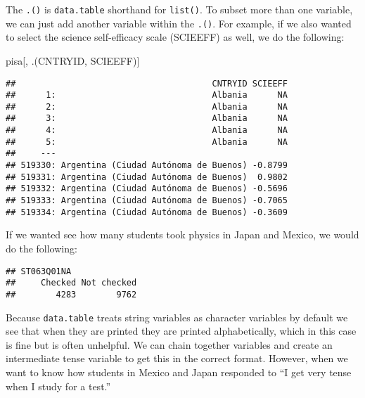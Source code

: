 \documentclass[]{book}
\newenvironment{Shaded}{\begin{snugshade}}{\end{snugshade}}
\newcommand{\KeywordTok}[1]{\textcolor[rgb]{0.13,0.29,0.53}{\textbf{#1}}}
\newcommand{\NormalTok}[1]{#1}
\newcommand{\OperatorTok}[1]{\textcolor[rgb]{0.81,0.36,0.00}{\textbf{#1}}}
\newcommand{\StringTok}[1]{\textcolor[rgb]{0.31,0.60,0.02}{#1}}
\begin{document}
The \texttt{.()} is \texttt{data.table} shorthand for \texttt{list()}. To subset more than one variable, we can just add another variable within the \texttt{.()}. For example, if we also wanted to select the science self-efficacy scale (SCIEEFF) as well, we do the following:

\begin{Shaded}
\begin{Highlighting}[]
\NormalTok{pisa[,}
\NormalTok{     .(CNTRYID, SCIEEFF)]}
\end{Highlighting}
\end{Shaded}

\begin{verbatim}
##                                       CNTRYID SCIEEFF
##      1:                               Albania      NA
##      2:                               Albania      NA
##      3:                               Albania      NA
##      4:                               Albania      NA
##      5:                               Albania      NA
##     ---                                              
## 519330: Argentina (Ciudad Autónoma de Buenos) -0.8799
## 519331: Argentina (Ciudad Autónoma de Buenos)  0.9802
## 519332: Argentina (Ciudad Autónoma de Buenos) -0.5696
## 519333: Argentina (Ciudad Autónoma de Buenos) -0.7065
## 519334: Argentina (Ciudad Autónoma de Buenos) -0.3609
\end{verbatim}

If we wanted see how many students took physics in Japan and Mexico, we would do the following:

\begin{Shaded}
\end{Shaded}

\begin{verbatim}
## ST063Q01NA
##     Checked Not checked 
##        4283        9762
\end{verbatim}

Because \texttt{data.table} treats string variables as character variables by default we see that when they are printed they are printed alphabetically, which in this case is fine but is often unhelpful. We can chain together variables and create an intermediate tense variable to get this in the correct format. However, when we want to know how students in Mexico and Japan responded to ``I get very tense when I study for a test.''
\end{document}
